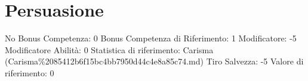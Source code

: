 \section{Persuasione}\label{persuasione}

\begin{description}
\tightlist
\item[Tags: ABI]
No Bonus Competenza: 0 Bonus Competenza di Riferimento: 1 Modificatore:
-5 Modificatore Abilità: 0 Statistica di riferimento: Carisma
(Carisma\%2085412b6f15bc4bb7950d44c4e8a85c74.md) Tiro Salvezza: -5
Valore di riferimento: 0
\end{description}
